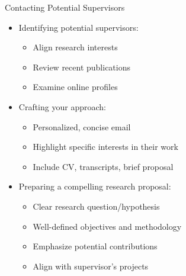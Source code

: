 \documentclass[10pt]{beamer}
\begin{document}
\begin{frame}[fragile]{Contacting Potential Supervisors}
    \begin{itemize}
        \item Identifying potential supervisors:
            \begin{itemize}
                \item Align research interests
                \item Review recent publications
                \item Examine online profiles
            \end{itemize}
        \item Crafting your approach:
            \begin{itemize}
                \item Personalized, concise email
                \item Highlight specific interests in their work
                \item Include CV, transcripts, brief proposal
            \end{itemize}
        \item Preparing a compelling research proposal:
            \begin{itemize}
                \item Clear research question/hypothesis
                \item Well-defined objectives and methodology
                \item Emphasize potential contributions
                \item Align with supervisor's projects
            \end{itemize}
    \end{itemize}
\end{frame}
\end{document}
